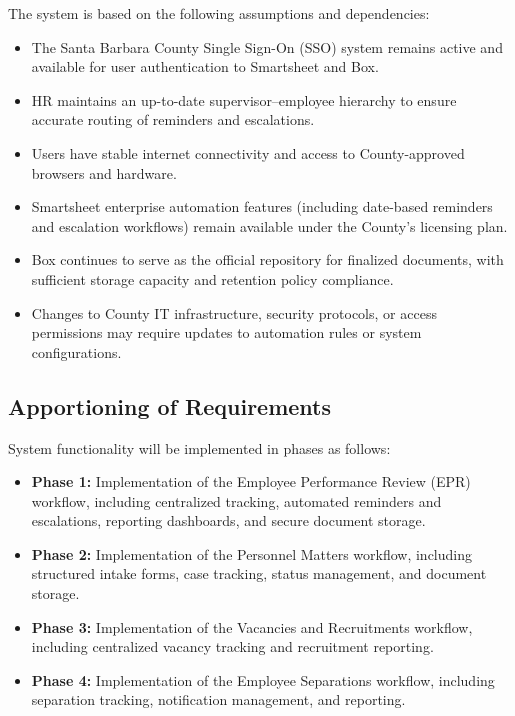 \documentclass[12pt]{article}
\begin{document}
The system is based on the following assumptions and dependencies:

\begin{itemize}
    \item The Santa Barbara County Single Sign-On (SSO) system remains active and available for user authentication to Smartsheet and Box.
    \item HR maintains an up-to-date supervisor–employee hierarchy to ensure accurate routing of reminders and escalations.
    \item Users have stable internet connectivity and access to County-approved browsers and hardware.
    \item Smartsheet enterprise automation features (including date-based reminders and escalation workflows) remain available under the County’s licensing plan.
    \item Box continues to serve as the official repository for finalized documents, with sufficient storage capacity and retention policy compliance.
    \item Changes to County IT infrastructure, security protocols, or access permissions may require updates to automation rules or system configurations.
\end{itemize}

\subsection{Apportioning of Requirements}

System functionality will be implemented in phases as follows:

\begin{itemize}
    \item \textbf{Phase 1:} Implementation of the Employee Performance Review (EPR) workflow, including centralized tracking, automated reminders and escalations, reporting dashboards, and secure document storage.
    
    \item \textbf{Phase 2:} Implementation of the Personnel Matters workflow, including structured intake forms, case tracking, status management, and document storage.
    
    \item \textbf{Phase 3:} Implementation of the Vacancies and Recruitments workflow, including centralized vacancy tracking and recruitment reporting.
    
    \item \textbf{Phase 4:} Implementation of the Employee Separations workflow, including separation tracking, notification management, and reporting.
\end{itemize}
\end{document}
